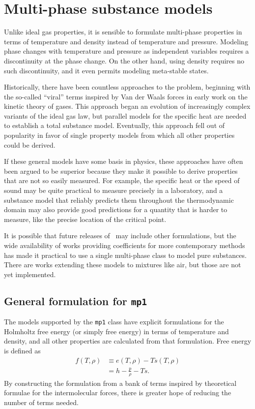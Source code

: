 \chapter{Multi-phase substance models}\label{ch:mp}

Unlike ideal gas properties, it is sensible to formulate multi-phase properties in terms of temperature and density instead of temperature and pressure.  Modeling phase changes with temperature and pressure as independent variables requires a discontinuity at the phase change.  On the other hand, using density requires no such discontinuity, and it even permits modeling meta-stable states.

Historically, there have been countless approaches to the problem, beginning with the so-called ``viral'' terms inspired by Van der Waals forces in early work on the kinetic theory of gases.  This approach began an evolution of increasingly complex variants of the ideal gas law, but parallel models for the specific heat are needed to establish a total substance model.  Eventually, this approach fell out of popularity in favor of single property models from which all other properties could be derived.  

If these general models have some basis in physics, these approaches have often been argued to be superior because they make it possible to derive properties that are not so easily measured.  For example, the specific heat or the speed of sound may be quite practical to measure precisely in a laboratory, and a substance model that reliably predicts them throughout the thermodynamic domain may also provide good predictions for a quantity that is harder to measure, like the precise location of the critical point.

It is possible that future releases of \PM\ may include other formulations, but the wide availability of works providing coefficients for more contemporary methods has made it practical to use a single multi-phase class to model pure substances.  There are works extending these models to mixtures like air, but those are not yet implemented.

\section{General formulation for \texttt{mp1}}\label{sec:mp:mp1}

The models supported by the \texttt{mp1} class have explicit formulations for the Holmholtz free energy (or simply free energy) in terms of temperature and density, and all other properties are calculated from that formulation.  Free energy is defined as
\begin{align}
f(T,\rho) &\equiv e(T,\rho) - T s(T,\rho)\\
 &= h - \frac{p}{\rho} - T s.
\end{align}
By constructing the formulation from a bank of terms inspired by theoretical formulae for the intermolecular forces, there is greater hope of reducing the number of terms needed. 

